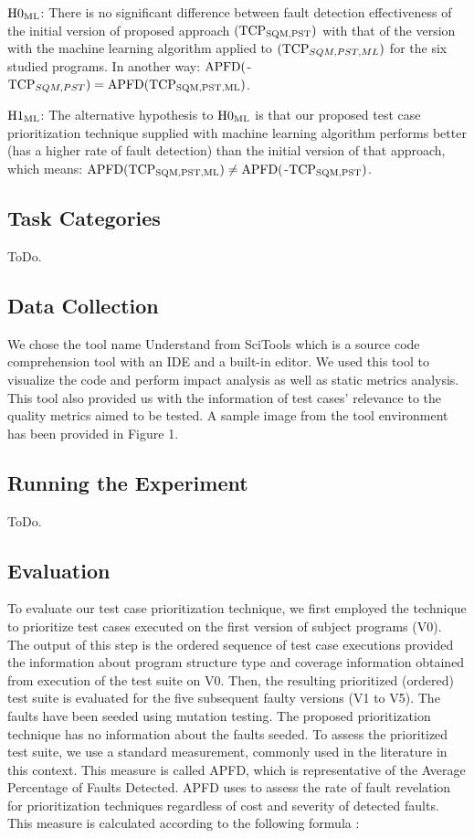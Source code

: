 \documentclass{sig-alternate}
\begin{document}
$\textnormal{H0} _{\textnormal{ML}}$: There is no significant difference between fault detection effectiveness of the initial version of proposed approach $(\textnormal{TCP} _{\textnormal{SQM,PST}})$ with that of the version with the machine learning algorithm applied to $(\textnormal{TCP} _{SQM,PST,ML})$ for the six studied programs. In another way: $\textnormal{APFD}($-$\textnormal{TCP} _{SQM,PST}) = \textnormal{APFD}(\textnormal{TCP} _{\textnormal{SQM,PST,ML}})$. 

$\textnormal{H1} _{\textnormal{ML}}$: The alternative hypothesis to $\textnormal{H0} _{\textnormal{ML}}$ is that our proposed test case prioritization technique supplied with machine learning algorithm performs better (has a higher rate of fault detection)
than the initial version of that approach, which means: $\textnormal{APFD}(\textnormal{TCP} _{\textnormal{SQM,PST,ML}}) \neq \textnormal{APFD}($-$\textnormal{TCP} _{\textnormal{SQM,PST}})$.

\subsection{Task Categories}
ToDo.
\subsection{Data Collection}
We chose the tool name Understand from SciTools which is a source code comprehension tool with an IDE and a built-in editor. We used this tool to visualize the code and perform impact analysis as well as static metrics analysis. This tool also provided us with the information of test cases' relevance to the quality metrics aimed to be tested. A sample image from the tool environment has been provided in Figure 1. 
\subsection{Running the Experiment}
ToDo.
\subsection{Evaluation}
To evaluate our test case prioritization technique, we first employed the technique to prioritize test cases executed on the first version of subject programs (V0). The output of this step is the ordered sequence of test case executions provided the information about program structure type and coverage information
obtained from execution of the test suite on V0. Then, the resulting prioritized (ordered) test suite is evaluated for the five subsequent faulty versions (V1 to V5). The faults have been seeded using mutation testing. The proposed prioritization technique has no information about the faults seeded. To assess the prioritized test suite, we use a standard measurement, commonly used in the literature in this context. This measure is called APFD, which is representative of the Average Percentage of Faults Detected. APFD uses to assess the rate of fault revelation for prioritization techniques regardless of cost and severity of detected faults. This measure is calculated according to the following formula \cite{zhang:bridging}:\\
\end{document}
